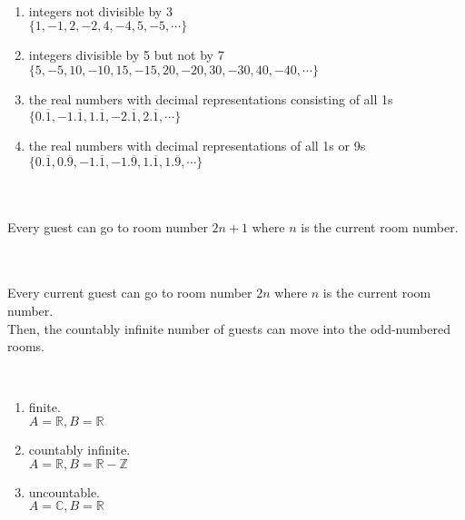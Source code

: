 \documentclass[12pt]{article}  %
\begin{document}
\\
\begin{enumerate}
    \item integers not divisible by 3\\
    $\{1,-1,2,-2,4,-4,5,-5,\cdots\}$
    \item integers divisible by 5 but not by 7\\
    $\{5,-5,10,-10,15,-15,20,-20,30,-30,40,-40,\cdots\}$
    \item the real numbers with decimal representations consisting of all 1s\\
    $\{0.\overline{1},-1.\overline{1},1.\overline{1},-2.\overline{1},2.\overline{1},\cdots\}$
    \item the real numbers with decimal representations of all 1s or 9s\\
    $\{0.\overline{1},0.\overline{9},-1.\overline{1},-1.\overline{9},1.\overline{1},1.\overline{9},\cdots\}$
    
\end{enumerate}

\\
\\
Every guest can go to room number $2n+1$ where $n$ is the current room number.

\\
\\
Every current guest can go to room number $2n$ where $n$ is the current room number.\\
Then, the countably infinite number of guests can move into the odd-numbered rooms.

\\
\begin{enumerate}
    \item finite.\\
    $A=\mathbb{R},B=\mathbb{R}$
    
    \item countably infinite.\\
    $A=\mathbb{R},B=\mathbb{R}-\mathbb{Z}$
    
    \item uncountable.\\
    $A=\mathbb{C},B=\mathbb{R}$
\end{enumerate}
\end{document}

